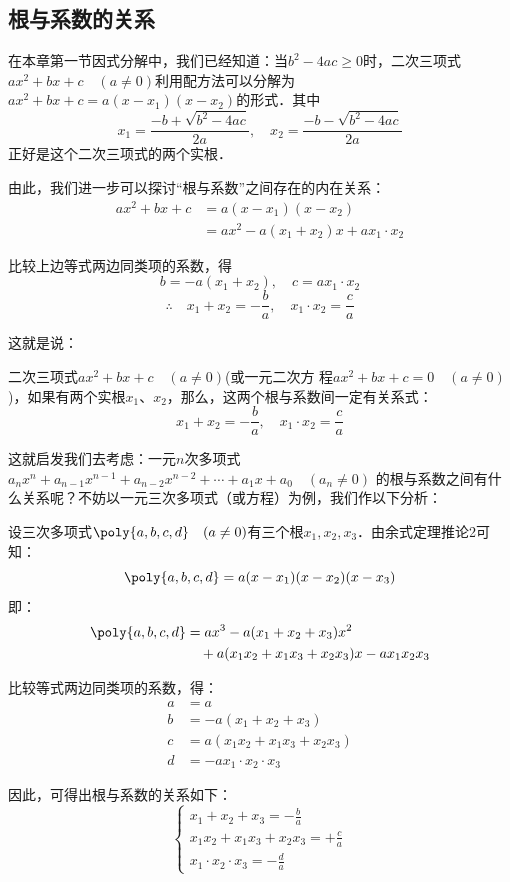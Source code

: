 \subsection{根与系数的关系}
在本章第一节因式分解中，我们已经知道：当$b^2-4ac\ge 0$时，二次三项式$ax^2+bx+c\quad (a\ne 0)$利用配方法可以分解为 $ax^2+bx+c=a(x-x_1)(x-x_2)$的形式．其中
\[x_1=\frac{-b+\sqrt{b^2-4ac}}{2a},\quad x_2=\frac{-b-\sqrt{b^2-4ac}}{2a}\]
正好是这个二次三项式的两个实根．

由此，我们进一步可以探讨“根与系数”之间存在的内在关系：
\[\begin{split}
    ax^2+bx+c&=a (x-x_1) (x-x_2)\\
&=ax^2-a(x_1+x_2)x+ax_1\cdot x_2
\end{split}\]

比较上边等式两边同类项的系数，得
\[b=-a(x_1+x_2),\quad c=ax_1\cdot x_2 \]
\[\therefore\quad x_1+x_2=-\frac{b}{a},\quad x_1\cdot x_2=\frac{c}{a}\]

这就是说：
\begin{blk}{}
    二次三项式$ax^2+bx+c\quad (a\ne 0)$(或一元二次方
程$ax^2+bx+c=0\quad (a\ne 0)$ )，如果有两个实根$x_1$、$x_2$，那么，这两个根与系数间一定有关系式：
\[ x_1+x_2=-\frac{b}{a},\quad x_1\cdot x_2=\frac{c}{a} \]
\end{blk}

这就启发我们去考虑：一元$n$次多项式
$a_nx^n+a_{n-1}x^{n-1}+a_{n-2}x^{n-2}+\cdots+a_1x+a_0\quad (a_n\ne 0)$
的根与系数之间有什么关系呢？不妨以一元三次多项式（或方程）为例，我们作以下分析：

设三次多项式$\poly{a,b,c,d}\quad (a\ne 0)$有三个根$x_1,x_2,x_3$．由余式定理推论2可知：
\[ \poly{a,b,c,d}=a(x-x_1)(x-x_2)(x-x_3) \]
即：
\[\begin{split}
    \poly{a,b,c,d} &= ax^3-a(x_1+x_2+x_3)x^2\\
    &\quad +a(x_1x_2+x_1x_3+x_2x_3)x-ax_1x_2x_3
\end{split}\]

比较等式两边同类项的系数，得：
\[\begin{split}
    a&=a\\
    b&=-a(x_1+x_2+x_3)\\
    c&=a(x_1x_2+x_1x_3+x_2x_3)\\
    d&=-ax_1\cdot x_2\cdot x_3
\end{split}\]

因此，可得出根与系数的关系如下：
\[ \begin{cases}
    x_1+x_2+x_3 =-\frac{b}{a}\\
    x_1x_2+x_1x_3+x_2x_3=+\frac{c}{a}\\
    x_1\cdot x_2\cdot x_3=-\frac{d}{a}
\end{cases} \]

